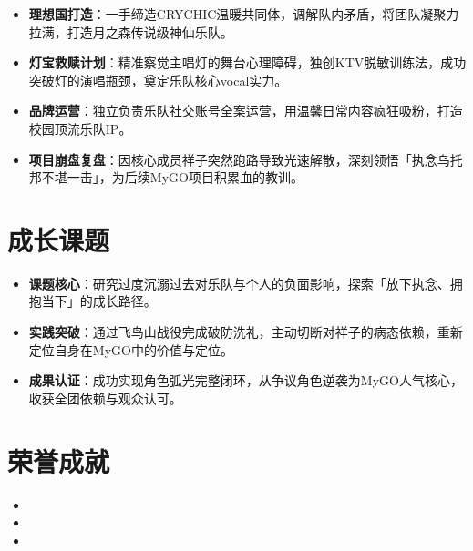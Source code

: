 \documentclass{resume}                      %
\begin{document}
\begin{itemize}
    \item \textbf{理想国打造}：一手缔造CRYCHIC温暖共同体，调解队内矛盾，将团队凝聚力拉满，打造月之森传说级神仙乐队。
    \item \textbf{灯宝救赎计划}：精准察觉主唱灯的舞台心理障碍，独创KTV脱敏训练法，成功突破灯的演唱瓶颈，奠定乐队核心vocal实力。
    \item \textbf{品牌运营}：独立负责乐队社交账号全案运营，用温馨日常内容疯狂吸粉，打造校园顶流乐队IP。
    \item \textbf{项目崩盘复盘}：因核心成员祥子突然跑路导致光速解散，深刻领悟「执念乌托邦不堪一击」，为后续MyGO项目积累血的教训。
\end{itemize}

\section{成长课题}
\begin{itemize}
    \item \textbf{课题核心}：研究过度沉溺过去对乐队与个人的负面影响，探索「放下执念、拥抱当下」的成长路径。
    \item \textbf{实践突破}：通过飞鸟山战役完成破防洗礼，主动切断对祥子的病态依赖，重新定位自身在MyGO中的价值与定位。
    \item \textbf{成果认证}：成功实现角色弧光完整闭环，从争议角色逆袭为MyGO人气核心，收获全团依赖与观众认可。
\end{itemize}

\section{荣誉成就}
\begin{itemize}
    \item {}
    \item {}
    \item {}
\end{itemize}
\end{document}
